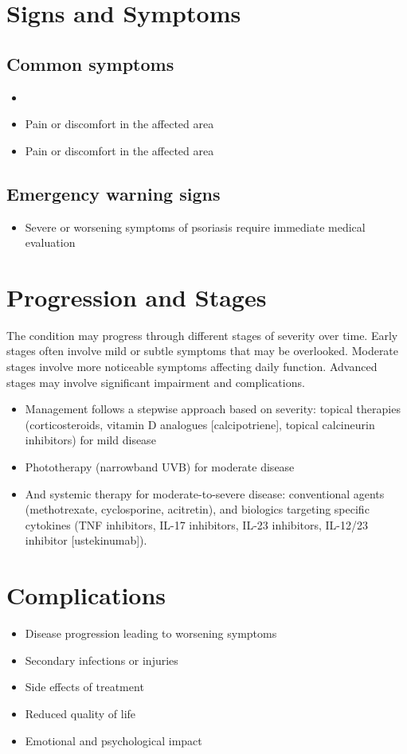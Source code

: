 \section{Signs and Symptoms}

\subsection{Common symptoms}
\begin{itemize}[noitemsep]
  \item \item Pain or discomfort in the affected area    \item Pain or discomfort in the affected area
  \end{itemize}

\subsection{Emergency warning signs}
\begin{itemize}[noitemsep]
  \item Severe or worsening symptoms of psoriasis require immediate medical evaluation
\end{itemize}
\section{Progression and Stages}
The condition may progress through different stages of severity over time. Early stages often involve mild or subtle symptoms that may be overlooked. Moderate stages involve more noticeable symptoms affecting daily function. Advanced stages may involve significant impairment and complications.

\begin{itemize}[noitemsep]
  \item Management follows a stepwise approach based on severity: topical therapies (corticosteroids, vitamin D analogues [calcipotriene], topical calcineurin inhibitors) for mild disease
  \item Phototherapy (narrowband UVB) for moderate disease
  \item And systemic therapy for moderate-to-severe disease: conventional agents (methotrexate, cyclosporine, acitretin), and biologics targeting specific cytokines (TNF inhibitors, IL-17 inhibitors, IL-23 inhibitors, IL-12/23 inhibitor [ustekinumab]).
\end{itemize}
\section{Complications}
\begin{itemize}[noitemsep]
  \item Disease progression leading to worsening symptoms
  \item Secondary infections or injuries
  \item Side effects of treatment
  \item Reduced quality of life
  \item Emotional and psychological impact
\end{itemize}

